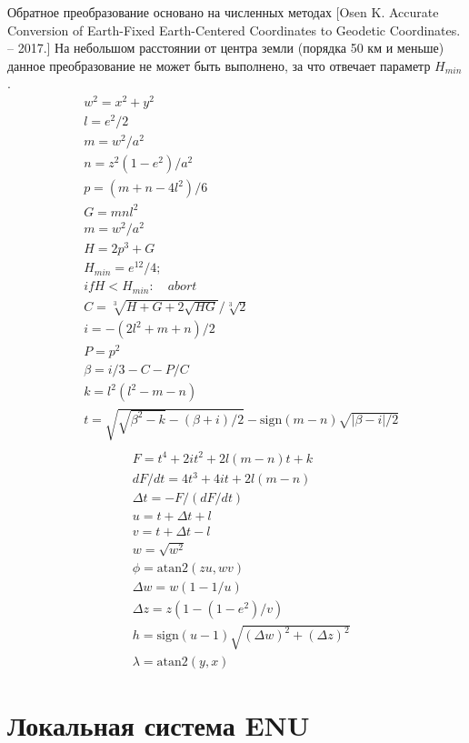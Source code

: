 \documentclass[a4paper,12pt]{article}
\begin{document}
Обратное преобразование основано на численных методах
[Osen K. Accurate Conversion of Earth-Fixed Earth-Centered Coordinates to Geodetic Coordinates. – 2017.] На небольшом расстоянии от центра земли (порядка 50 км и меньше) данное преобразование не может быть выполнено, за что отвечает параметр $H_{min}$.
\begin{align} 
&w^2 = x^2 + y^2 \\
&l = e^2 / 2 \\
&m = w^2 / a^2 \\
&n = z^2(1-e^2) / a^2 \\
&p = (m + n - 4l^2) / 6 \\
&G = mnl^2 \\&m = w^2 / a^2 \\
&H = 2p^3 + G \\
&H_{min} = e^ {12} / 4; \\
&if H < H_{min}: \quad abort \\
&C = \sqrt[3]{H + G + 2 \sqrt{HG}} / \sqrt[3]{2} \\
&i = -(2l^2 + m + n) / 2 \\
&P = p^2 \\
&\beta = i/3 - C - P/C \\
&k = l^2(l^2 - m - n) \\
&t = \sqrt{\sqrt{\beta^2-k} - (\beta + i)/2} - \text{sign} (m-n) \sqrt{|\beta - i| / 2} \\
\end{align}
\begin{align} 
&F = t^4 + 2it^2 + 2l(m-n)t + k \\
&dF / dt = 4t^3 + 4it + 2l (m-n) \\
&\Delta t = -F / (dF/dt) \\
&u = t + \Delta t + l\\
&v = t + \Delta t - l\\
&w = \sqrt{w^2} \\
&\phi = \text{atan2} (zu, wv) \\
&\Delta w = w(1-1/u) \\
&\Delta z = z(1-(1 - e^2)/v) \\
&h = \text{sign} (u -1) \sqrt {(\Delta w)^2 + (\Delta z)^2} \\
&\lambda = \text{atan2} (y, x)
\end{align}

\section{Локальная система ENU}
\end{document}
